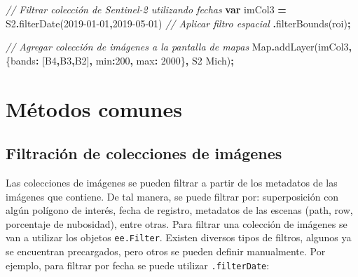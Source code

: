 \documentclass[
  12pt,
  letterpaper,
  twoside]{book}
\newenvironment{Shaded}{\begin{snugshade}}{\end{snugshade}}
\newcommand{\BuiltInTok}[1]{#1}
\newcommand{\CommentTok}[1]{\textcolor[rgb]{0.56,0.35,0.01}{\textit{#1}}}
\newcommand{\DataTypeTok}[1]{\textcolor[rgb]{0.13,0.29,0.53}{#1}}
\newcommand{\DecValTok}[1]{\textcolor[rgb]{0.00,0.00,0.81}{#1}}
\newcommand{\FunctionTok}[1]{\textcolor[rgb]{0.00,0.00,0.00}{#1}}
\newcommand{\KeywordTok}[1]{\textcolor[rgb]{0.13,0.29,0.53}{\textbf{#1}}}
\newcommand{\NormalTok}[1]{#1}
\newcommand{\OperatorTok}[1]{\textcolor[rgb]{0.81,0.36,0.00}{\textbf{#1}}}
\newcommand{\StringTok}[1]{\textcolor[rgb]{0.31,0.60,0.02}{#1}}
\begin{document}
\begin{Shaded}
\begin{Highlighting}[]
\CommentTok{// Filtrar colección de Sentinel{-}2 utilizando fechas}
\KeywordTok{var}\NormalTok{ imCol3 }\OperatorTok{=}\NormalTok{ S2}\OperatorTok{.}\FunctionTok{filterDate}\NormalTok{(}\StringTok{\textquotesingle{}2019{-}01{-}01\textquotesingle{}}\OperatorTok{,}\StringTok{\textquotesingle{}2019{-}05{-}01\textquotesingle{}}\NormalTok{)}
  \CommentTok{// Aplicar filtro espacial}
 \OperatorTok{.}\FunctionTok{filterBounds}\NormalTok{(roi)}\OperatorTok{;}

\CommentTok{// Agregar colección de imágenes a la pantalla de mapas}
\BuiltInTok{Map}\OperatorTok{.}\FunctionTok{addLayer}\NormalTok{(imCol3}\OperatorTok{,}\NormalTok{ \{}\DataTypeTok{bands}\OperatorTok{:}\NormalTok{ [}\StringTok{\textquotesingle{}B4\textquotesingle{}}\OperatorTok{,}\StringTok{\textquotesingle{}B3\textquotesingle{}}\OperatorTok{,}\StringTok{\textquotesingle{}B2\textquotesingle{}}\NormalTok{]}\OperatorTok{,} \DataTypeTok{min}\OperatorTok{:}\DecValTok{200}\OperatorTok{,} \DataTypeTok{max}\OperatorTok{:} \DecValTok{2000}\NormalTok{\}}\OperatorTok{,} 
  \StringTok{\textquotesingle{}S2 Mich\textquotesingle{}}\NormalTok{)}\OperatorTok{;}
\end{Highlighting}
\end{Shaded}

\hypertarget{muxe9todos-comunes-4}{%
\section{Métodos comunes}\label{muxe9todos-comunes-4}}

\hypertarget{filtraciuxf3n-de-colecciones-de-imuxe1genes}{%
\subsection*{Filtración de colecciones de imágenes}\label{filtraciuxf3n-de-colecciones-de-imuxe1genes}}

Las colecciones de imágenes se pueden filtrar a partir de los metadatos de las imágenes que contiene. De tal manera, se puede filtrar por: superposición con algún polígono de interés, fecha de registro, metadatos de las escenas (path, row, porcentaje de nubosidad), entre otras. Para filtrar una colección de imágenes se van a utilizar los objetos \texttt{ee.Filter}. Existen diversos tipos de filtros, algunos ya se encuentran precargados, pero otros se pueden definir manualmente. Por ejemplo, para filtrar por fecha se puede utilizar \texttt{.filterDate}:
\end{document}
